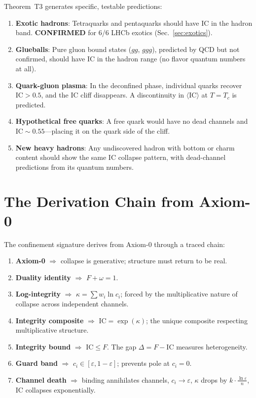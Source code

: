 \documentclass[
  aps,
  prd,
  twocolumn,
  superscriptaddress,
  nofootinbib,
  floatfix
]{revtex4-2}
\newcommand{\eps}{\varepsilon}
\newcommand{\IC}{\mathrm{IC}}
\begin{document}
Theorem~T3 generates specific, testable predictions:

\begin{enumerate}
\item \textbf{Exotic hadrons}: Tetraquarks and pentaquarks should
  have $\IC$ in the hadron band.
  \textcolor{WeldGreen}{\textbf{CONFIRMED}} for 6/6 LHCb
  exotics (Sec.~\ref{sec:exotics}).

\item \textbf{Glueballs}: Pure gluon bound states ($gg$, $ggg$),
  predicted by QCD but not confirmed, should have $\IC$ in the
  hadron range (no flavor quantum numbers at all).

\item \textbf{Quark-gluon plasma}: In the deconfined phase,
  individual quarks recover $\IC > 0.5$, and the IC cliff
  disappears.  A discontinuity in $\langle\IC\rangle$ at
  $T = T_c$ is predicted.

\item \textbf{Hypothetical free quarks}: A free quark would have
  no dead channels and $\IC \sim 0.55$---placing it on the quark
  side of the cliff.

\item \textbf{New heavy hadrons}: Any undiscovered hadron with
  bottom or charm content should show the same IC collapse
  pattern, with dead-channel predictions from its quantum numbers.
\end{enumerate}


\section{The Derivation Chain from Axiom-0}\label{sec:axiom}

The confinement signature derives from Axiom-0 through a traced
chain:

\begin{enumerate}
\item \textbf{Axiom-0} $\Rightarrow$ collapse is generative;
  structure must return to be real.
\item \textbf{Duality identity} $\Rightarrow$ $F + \omega = 1$.
\item \textbf{Log-integrity} $\Rightarrow$
  $\kappa = \sum w_i \ln c_i$; forced by the multiplicative
  nature of collapse across independent channels.
\item \textbf{Integrity composite} $\Rightarrow$
  $\IC = \exp(\kappa)$; the unique composite respecting
  multiplicative structure.
\item \textbf{Integrity bound} $\Rightarrow$ $\IC \leq F$.
  The gap $\Delta = F - \IC$ measures heterogeneity.
\item \textbf{Guard band} $\Rightarrow$
  $c_i \in [\eps, 1{-}\eps]$; prevents pole at $c_i = 0$.
\item \textbf{Channel death} $\Rightarrow$ binding annihilates
  channels, $c_i \to \eps$, $\kappa$ drops by
  $k \cdot \frac{\ln \eps}{n}$, $\IC$ collapses exponentially.
\end{enumerate}
\end{document}
